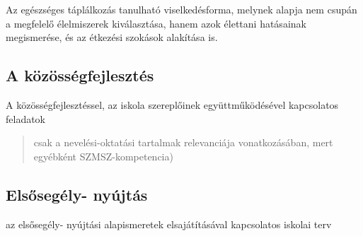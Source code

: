 Az egészséges táplálkozás tanulható viselkedésforma, melynek alapja nem
csupán a megfelelő élelmiszerek kiválasztása, hanem azok élettani
hatásainak megismerése, és az étkezési szokások alakítása is.

\subsection{A
közösségfejlesztés}\label{a-kuxf6zuxf6ssuxe9gfejlesztuxe9s}

A közösségfejlesztéssel, az iskola szereplőinek együttműködésével
kapcsolatos feladatok

\begin{quote}
csak a nevelési-oktatási tartalmak relevanciája vonatkozásában, mert
egyébként SZMSZ-kompetencia)
\end{quote}

\subsection{Elsősegély-
nyújtás}\label{elsux151seguxe9ly--nyuxfajtuxe1s}

az elsősegély- nyújtási alapismeretek elsajátításával kapcsolatos
iskolai terv
